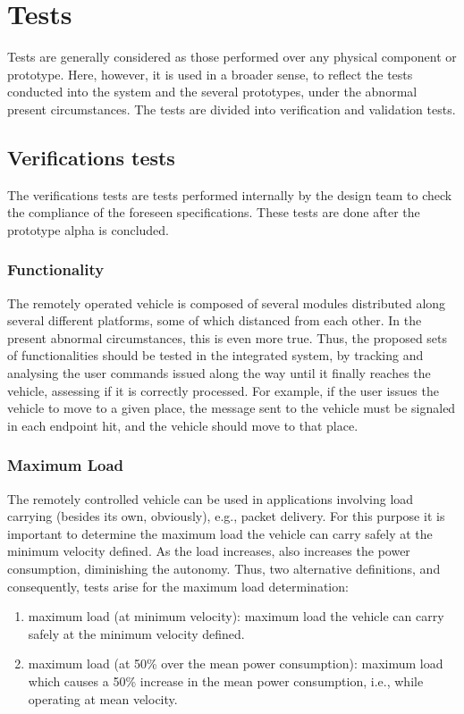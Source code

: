 \section{Tests}%
\label{sec:org3e2776f}
Tests are generally considered as those performed over any physical
component or prototype. Here, however, it is used in a broader sense, to reflect the tests
conducted into the system and the several prototypes, under the abnormal present
circumstances. The tests are divided into verification and validation tests.
\subsection{Verifications tests}%
\label{sec:orge9c79e2}
The verifications tests are tests performed internally by the design team to
check the compliance of the foreseen specifications. These tests are done after
the prototype alpha is concluded.

\subsubsection{Functionality}%
\label{sec:functionality}
The remotely operated vehicle is composed of several modules distributed along
several different platforms, some of which distanced from each other. In the
present abnormal circumstances, this is even more true. Thus, the proposed sets
of functionalities should be tested in the integrated system, by tracking and
analysing the user commands issued along the way until it finally reaches the
vehicle, assessing if it is correctly processed. For example, if the user issues
the vehicle to move to a given place, the message sent to the vehicle must be
signaled in each endpoint hit, and the vehicle should move to that place.

\subsubsection{Maximum Load}%
\label{sec:load}
The remotely controlled vehicle can be used in applications involving load
carrying (besides its own, obviously), e.g., packet delivery. For this purpose
it is important to determine the maximum load the vehicle can carry safely at
the minimum velocity defined. As the load increases, also increases the power
consumption, diminishing the autonomy. Thus, two alternative definitions, and
consequently, tests arise for the maximum load determination:
\begin{enumerate}
\item maximum load (at minimum velocity): maximum load the vehicle can carry
  safely at the minimum velocity defined.
\item maximum load (at 50\% over the mean power consumption): maximum load which
  causes a 50\% increase in the mean power consumption, i.e., while operating at
  mean velocity.
\end{enumerate}

